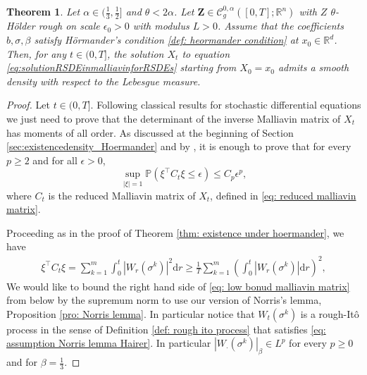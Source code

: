 \documentclass[11pt,a4paper]{article}
\newcommand{\R}{\mathbb{R}}
\newcommand{\rd}{\mathrm{d}}
\theoremstyle{plain}
\newtheorem{thm}[defn]{Theorem}
\begin{document}
    \begin{thm}
    \label{thm: smoothness of densities}
    Let $\alpha \in (\frac{1}{3}, \frac{1}{2}]$ and $\theta < 2\alpha$. Let $\mathbf{Z} \in \mathscr{C}^{0,\alpha}_g([0,T];\R^n)$ with $Z$ $\theta$-H\"older rough on scale $\epsilon_0>0$ with modulus $L>0$.
    Assume that the coefficients $b,\sigma,\beta$ satisfy H\"ormander's condition \ref{def: heormander condition} at {$x_0 \in \R^d$}. Then, {for any $t \in (0,T]$}, the solution $X_t$ to equation \eqref{eq:solutionRSDEinmalliavinforRSDEs} starting from $X_0=x_0$ admits a smooth density with respect to the Lebesgue measure.
\end{thm}
\begin{proof}
    Let $t \in (0,T]$. 
    Following classical results for stochastic differential equations we just need to prove that the determinant of the inverse Malliavin matrix of $X_t$ has moments of all order.
    {As discussed at the beginning of Section \ref{sec:existencedensity_Hoermander} and}
    by \cite[Lemma 2.3.1]{nualart2006malliavin}, it is enough to prove that for every $p\geq 2$ and for all $\epsilon >0$,
    \begin{equation}
    \label{eq: criterion for smoothness}
        \sup_{|\xi| = 1} \mathbb{P}(\xi^{\top} C_t \xi \leq \epsilon ) \leq C_p \epsilon^p,
    \end{equation}
    where $C_t$ is the reduced Malliavin matrix of $X_t$, defined in \eqref{eq: reduced malliavin matrix}.

    Proceeding as in the proof of Theorem \ref{thm: existence under hoermander}, we have
   \begin{align}
        \label{eq: low bonud malliavin matrix}
        \xi^{\top} C_t \xi
        = \sum_{k=1}^{m} \int_0^t |W_r(\sigma^k)|^2 \rd r
        \geq \frac{1}{T}
        \sum_{k=1}^{m} 
        \left(\int_0^t |W_r(\sigma^k)| \rd r\right)^2,
    \end{align}
    We would like to bound the right hand side of \eqref{eq: low bonud malliavin matrix} from below by the supremum norm to use our version of Norris's lemma, Proposition \ref{pro: Norris lemma}. In particular notice that $W_t(\sigma^k)$ is a rough-It\^o process in the sense of Definition \ref{def: rough ito process} that satisfies \eqref{eq: assumption Norris lemma Hairer}. In particular $|W_\cdot(\sigma^k)|_{\beta} \in L^p$ for every $p\geq 0$ and for $\beta=\frac{1}{3}$.
    

\end{proof}
\end{document}
